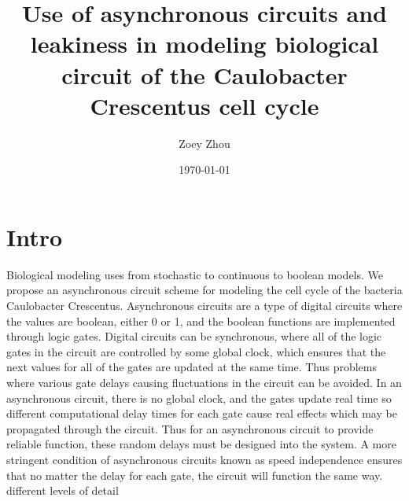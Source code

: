 \documentclass{article}
\title{Use of asynchronous circuits and leakiness in modeling biological circuit of the Caulobacter Crescentus cell cycle}
\author{Zoey Zhou}
\date{\today}
\begin{document}
\maketitle

\section{Intro}
Biological modeling uses from stochastic to continuous to boolean models.  We propose an asynchronous circuit scheme for modeling the cell cycle of the bacteria Caulobacter Crescentus.   Asynchronous circuits are a type of digital circuits where the values are boolean, either 0 or 1, and the boolean functions are implemented through logic gates.  Digital circuits can be synchronous, where all of the logic gates in the circuit are controlled by some global clock, which ensures that the next values for all of the gates are updated at the same time.  Thus problems where various gate delays causing fluctuations in the circuit can be avoided.  In an asynchronous circuit, there is no global clock, and the gates update real time so different computational delay times for each gate cause real effects which may be propagated through the circuit.  Thus for an asynchronous circuit to provide reliable function, these random delays must be designed into the system.  A more stringent condition of asynchronous circuits known as speed independence ensures that no matter the delay for each gate, the circuit will function the same way. 
 different levels of detail
\end{document}
